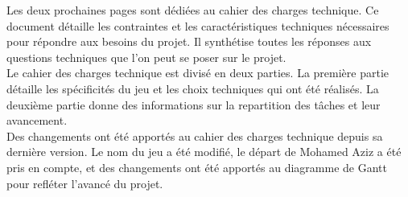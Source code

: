 

Les deux prochaines pages sont dédiées au cahier des charges technique.
Ce document détaille les contraintes et les caractéristiques techniques nécessaires pour répondre aux besoins du projet.
Il synthétise toutes les réponses aux questions techniques que l'on peut se poser sur le projet.
\\

Le cahier des charges technique est divisé en deux parties.
La première partie détaille les spécificités du jeu et les choix techniques qui ont été réalisés. 
La deuxième partie donne des informations sur la repartition des tâches et leur avancement.
\\

Des changements ont été apportés au cahier des charges technique depuis sa dernière version.
Le nom du jeu a été modifié, le départ de Mohamed Aziz a été pris en compte, et des changements ont été apportés au diagramme de Gantt pour refléter l'avancé du projet.





